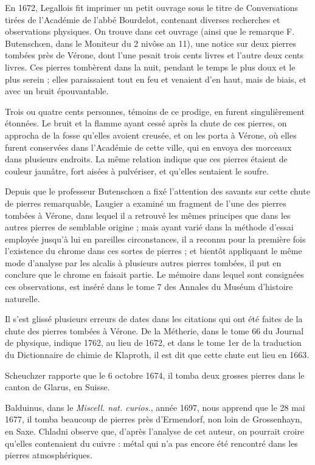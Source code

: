 \documentclass[a4paper, 12pt, oneside, french]{article}
\begin{document}
En 1672, Legallois fit imprimer un petit ouvrage sous le titre de Conversations tirées de l'Académie de l'abbé Bourdelot, contenant diverses recherches et observations physiques. On trouve dans cet ouvrage (ainsi que le remarque F. Butenschœn, dans le Moniteur du 2 nivôse an 11), une notice sur deux pierres tombées près de Vérone, dont l'une pesait trois cents livres et l'autre deux cents livres. Ces pierres tombèrent dans la nuit, pendant le temps le plus doux et le plus serein ; elles paraissaient tout en feu et venaient d'en haut, mais de biais, et avec un bruit épouvantable.

Trois ou quatre cents personnes, témoins de ce prodige, en furent singulièrement étonnées. Le bruit et la flamme ayant cessé après la chute de ces pierres, on approcha de la fosse qu'elles avoient creusée, et on les porta à Vérone, où elles furent conservées dans l'Académie de cette ville, qui en envoya des morceaux dans plusieurs endroits. La même relation indique que ces pierres étaient de couleur jaunâtre, fort aisées à pulvériser, et qu'elles sentaient le soufre.

Depuis que le professeur Butenschœn a fixé l'attention des savants sur cette chute de pierres remarquable, Laugier a examiné un fragment de l'une des pierres tombées à Vérone, dans lequel il a retrouvé les mêmes principes que dans les autres pierres de semblable origine ; mais ayant varié dans la méthode d'essai employée jusqu'à lui en pareilles circonstances, il a reconnu pour la première fois l'existence du chrome dans ces sortes de pierres ; et bientôt appliquant le même mode d'analyse par les alcalis à plusieurs autres pierres tombées, il put en conclure que le chrome en faisait partie. Le mémoire dans lequel sont consignées ces observations, est inséré dans le tome 7 des Annales du Muséum d'histoire naturelle.

Il s'est glissé plusieurs erreurs de dates dans les citations qui ont été faites de la chute des pierres tombées à Vérone. De la Métherie, dans le tome 66 du Journal de physique, indique 1762, au lieu de 1672, et dans le tome 1er de la traduction du Dictionnaire de chimie de Klaproth, il est dit que cette chute eut lieu en 1663.

Scheuchzer rapporte que le 6 octobre 1674, il tomba deux grosses pierres dans le canton de Glarus, en Suisse.

Balduinus, dans le \emph{Miscell. nat. curios.}, année 1697, nous apprend que le 28 mai 1677, il tomba beaucoup de pierres près d'Ermendorf, non loin de Grossenhayn, en Saxe. Chladni observe que, d'après l'analyse de cet auteur, on pourrait croire qu'elles contenaient du cuivre : métal qui n'a pas encore été rencontré dans les pierres atmosphériques.
\end{document}
